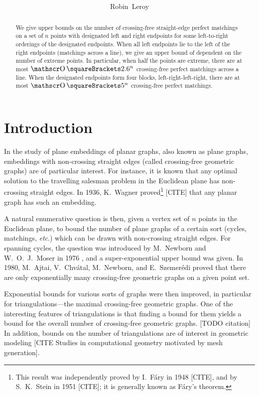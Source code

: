 \documentclass[10pt, a4paper, twoside]{basestyle}
\title{%
\textdisplay{%
On the number of crossing-free perfect matchings with designated left and right endpoints%
}%
}
\author{Robin~Leroy}
\newcommand{\etc}{\emph{etc}}
\begin{document}
\maketitle
\begin{abstract}
We give upper bounds on the number of crossing-free straight-edge perfect matchings on a set of $n$ points
with designated left and right endpoints for some left-to-right orderings of the designated endpoints.
When all left endpoints lie to the left of the right endpoints (matchings across a line),
we give an upper bound of dependent on the number of extreme points. In particular, when
half the points are extreme, there are at most $\BigO\of{2.6^n}$ crossing-free perfect matchings across a line.
When the designated endpoints form four blocks, left-right-left-right, there are at most $\BigO\of{5^n}$
crossing-free perfect matchings.
\end{abstract}

\section*{Introduction}
In the study of plane embeddings of planar graphs, also known as plane graphs,
embeddings with non-crossing straight edges (called crossing-free geometric graphs) are of particular
interest.
For instance, it is known \cite{LeeuwenSchoone1981} that any optimal solution to the travelling salesman problem in the
Euclidean plane has non-crossing straight edges.
In 1936, K.~Wagner proved\footnote{This result was independently proved by I.~Fáry in 1948 [CITE], and by
S.~K.~Stein in 1951 [CITE]; it is generally known as Fáry's theorem.} [CITE] that any planar graph has such an
embedding.

A natural enumerative question is then, given a vertex set of $n$ points in the Euclidean plane,
to bound the number of plane graphs of a certain sort (cycles, matchings, \etc.) which can be
drawn with non-crossing straight edges.
For spanning cycles, the question was introduced by M.~Newborn and W.~O.~J.~Moser in 1976 \cite{NewbornMoser1980},
and a super-exponential upper bound was given.
In 1980, M.~Ajtai, V.~Chvátal, M.~Newborn, and E.~Szemerédi \cite{AjtaiChvatalNewbornSzemeredi1982}
proved that there are only exponentially many crossing-free geometric graphs on a given point set.

Exponential bounds for various sorts of graphs were then improved, in particular for triangulations---the
maximal crossing-free geometric graphs. One of the interesting features of triangulations is that finding a bound for
them yields a bound for the overall number of crossing-free geometric graphs. [TODO citation] In addition,
bounds on the number of triangulations
are of interest in geometric modeling [CITE Studies in computational geometry motivated by mesh generation].
\end{document}
